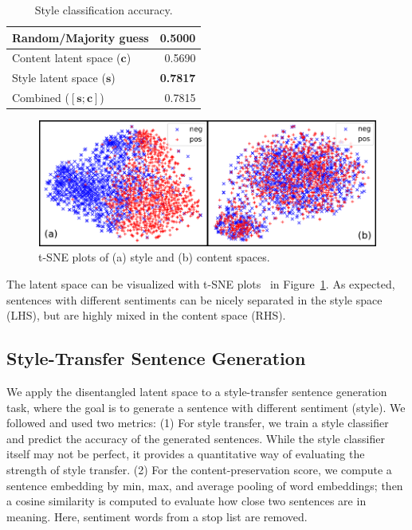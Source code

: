 \begin{table}
	\centering
	\begin{tabular}{| l | r |}
		\hline
		Random/Majority guess           & 0.5000          \\ \hline
		Content latent space  ($\bm c$) & 0.5690          \\
		Style latent space ($\bm s$)    & \textbf{0.7817} \\
		Combined ($[\bm s;\bm c]$)      & 0.7815          \\
		\hline
	\end{tabular}
	\caption{Style classification accuracy.}
	\label{tab:classification}
\end{table}

\begin{figure}
	\includegraphics[width=\linewidth]{images/tsne-style-and-content}
	\caption{t-SNE plots of (a) style and (b) content spaces.}
	\label{fig:tsne}
\end{figure}


The latent space can be visualized with t-SNE plots~\cite{maaten2008visualizing} in Figure~\ref{fig:tsne}. As expected, sentences with different sentiments can be nicely separated in the style space (LHS), but are highly mixed in the content space (RHS).


\subsection{Style-Transfer Sentence Generation}

We apply the disentangled latent space to a style-transfer sentence generation task, where the goal is to generate a sentence with different sentiment (style). We followed \cite{fu2017style} and used two metrics: (1) For style transfer, we train a style classifier and predict the accuracy of the generated sentences. While the style classifier itself may not be perfect, it provides a quantitative way of evaluating the strength of style transfer. (2) For the content-preservation score, we compute a sentence embedding by min, max, and average pooling of word embeddings; then a cosine similarity is computed to evaluate how close two sentences are in meaning. Here, sentiment words from a stop list \cite{hu2004mining} are removed.

